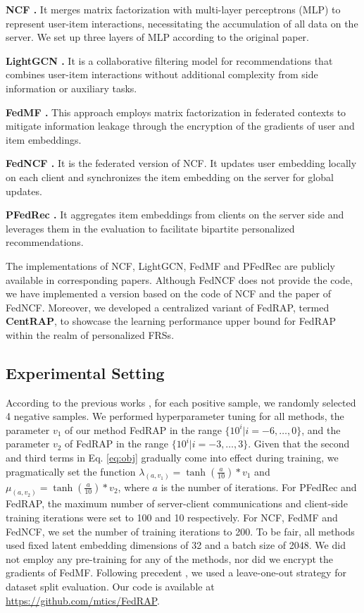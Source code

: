 \documentclass{article} %
\begin{document}
\textbf{NCF \citep{he2017neural}.} It merges matrix factorization with multi-layer perceptrons (MLP) to represent user-item interactions, necessitating the accumulation of all data on the server. We set up three layers of MLP according to the original paper.

\textbf{LightGCN \citep{he2017neural}.} It is  a collaborative filtering model for recommendations that combines user-item interactions without additional complexity from side information or auxiliary tasks.

\textbf{FedMF \citep{chai2020secure}.} This approach employs matrix factorization in federated contexts to mitigate information leakage through the encryption of the gradients of user and item embeddings.

\textbf{FedNCF \citep{perifanis2022federated}.} It is the federated version of NCF. It updates user embedding locally on each client and synchronizes the item embedding on the server for global updates.

\textbf{PFedRec \citep{zhangdual}.} It aggregates item embeddings from clients on the server side and leverages them in the evaluation to facilitate bipartite personalized recommendations.

The implementations of NCF, LightGCN, FedMF and PFedRec are publicly available in corresponding papers.
Although FedNCF does not provide the code, we have implemented a version based on the code of NCF and the paper of FedNCF.
Moreover, we developed a centralized variant of FedRAP, termed \textbf{CentRAP}, to showcase the learning performance upper bound for FedRAP within the realm of personalized FRSs.

\subsection{Experimental Setting}
According to the previous works \citep{he2017neural,zhangdual}, for each positive sample, we randomly selected 4 negative samples.
We performed hyperparameter tuning for all methods, the parameter $v_1$ of our method FedRAP in the range $\{10^i | i = -6, \dots, 0\}$, and  the parameter $v_2$ of FedRAP in the range $\{10^i | i = -3, \dots, 3\}$.
Given that the second and third terms in Eq. \ref{eq:obj} gradually come into effect during training, we pragmatically set the function $\lambda_{(a,v_1)} = \tanh(\frac{a}{10})*v_1$ and $\mu_{(a,v_2)} = \tanh(\frac{a}{10})*v_2$, where $a$ is the number of iterations. For PFedRec and FedRAP, the maximum number of server-client communications and client-side training iterations were set to 100 and 10 respectively. For NCF, FedMF and FedNCF, we set the number of training iterations to 200.
To be fair, all methods used fixed latent embedding dimensions of 32 and a batch size of 2048. We did not employ any pre-training for any of the methods, nor did we encrypt the gradients of FedMF. Following precedent \citep{he2017neural,zhangdual}, we used a leave-one-out strategy for dataset split evaluation.
Our code is available at \url{https://github.com/mtics/FedRAP}.
\end{document}
